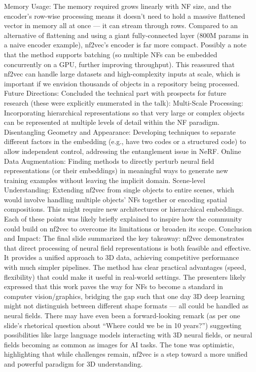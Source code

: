\documentclass[11pt]{article}
\begin{document}
Memory Usage: The memory required grows linearly with NF size, and the encoder’s row-wise processing means it doesn’t need to hold a massive flattened vector in memory all at once — it can stream through rows. Compared to an alternative of flattening and using a giant fully-connected layer (800M params in a naive encoder example), nf2vec’s encoder is far more compact.
Possibly a note that the method supports batching (so multiple NFs can be embedded concurrently on a GPU, further improving throughput).
This reassured that nf2vec can handle large datasets and high-complexity inputs at scale, which is important if we envision thousands of objects in a repository being processed.
Future Directions: Concluded the technical part with prospects for future research (these were explicitly enumerated in the talk):
Multi-Scale Processing: Incorporating hierarchical representations so that very large or complex objects can be represented at multiple levels of detail within the NF paradigm.
Disentangling Geometry and Appearance: Developing techniques to separate different factors in the embedding (e.g., have two codes or a structured code) to allow independent control, addressing the entanglement issue in NeRF.
Online Data Augmentation: Finding methods to directly perturb neural field representations (or their embeddings) in meaningful ways to generate new training examples without leaving the implicit domain.
Scene-level Understanding: Extending nf2vec from single objects to entire scenes, which would involve handling multiple objects’ NFs together or encoding spatial compositions. This might require new architectures or hierarchical embeddings.
Each of these points was likely briefly explained to inspire how the community could build on nf2vec to overcome its limitations or broaden its scope.
Conclusion and Impact: The final slide summarized the key takeaway: nf2vec demonstrates that direct processing of neural field representations is both feasible and effective. It provides a unified approach to 3D data, achieving competitive performance with much simpler pipelines. The method has clear practical advantages (speed, flexibility) that could make it useful in real-world settings. The presenters likely expressed that this work paves the way for NFs to become a standard in computer vision/graphics, bridging the gap such that one day 3D deep learning might not distinguish between different shape formats — all could be handled as neural fields. There may have even been a forward-looking remark (as per one slide’s rhetorical question about “Where could we be in 10 years?”) suggesting possibilities like large language models interacting with 3D neural fields, or neural fields becoming as common as images for AI tasks. The tone was optimistic, highlighting that while challenges remain, nf2vec is a step toward a more unified and powerful paradigm for 3D understanding.
\end{document}
